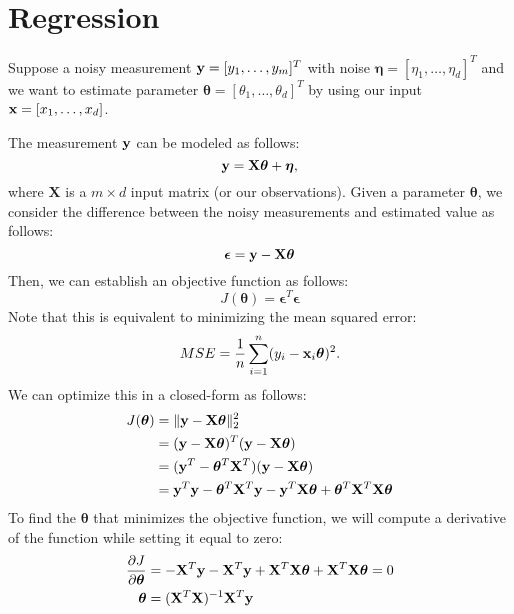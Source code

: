 \chapter{Regression}
\label{sec:basic_regression}
Suppose a noisy measurement ${\mathbf{y}} = [y_1, \dots, y_m]^T$ with noise $\boldsymbol{\eta} = [\eta_1, \dots, \eta_d]^T$ and we want to estimate parameter $\boldsymbol{\theta} = [\theta_1,\dots,\theta_d]^T$ by using our input ${\mathbf{x}} = [x_1, \dots, x_d]$. 

The measurement ${\mathbf{y}}$ can be modeled as follows:
$${\mathbf{y}} = \mathbf{X}\boldsymbol{\theta}+\boldsymbol{\eta},$$
where $\mathbf{X}$ is a $m\times d$ input matrix (or our observations). Given a parameter $\boldsymbol{\theta}$, we consider the difference between the noisy measurements and estimated value as follows:
$$\boldsymbol{\epsilon} = {\mathbf{y}} - \mathbf{X}\boldsymbol{\theta}$$
Then, we can establish an objective function as follows:
$$J(\boldsymbol{\theta}) = \boldsymbol{\epsilon}^T\boldsymbol{\epsilon}$$
Note that this is equivalent to minimizing the mean squared error:
$$MSE = \frac{1}{n}\sum_{i=1}^n (y_i-{\mathbf{x}}_i\boldsymbol{\theta})^2.$$
We can optimize this in a closed-form as follows:
\begin{align*}
	J(\boldsymbol{\theta}) &= \|\mathbf{y}-\mathbf{X}\boldsymbol{\theta}\|^2_2 \\
			&= (\mathbf{y}-\mathbf{X}\boldsymbol{\theta})^T(\mathbf{y}-\mathbf{X}\boldsymbol{\theta})\\
			&= (\mathbf{y}^T-\boldsymbol{\theta}^T\mathbf{X}^T)(\mathbf{y}-\mathbf{X}\boldsymbol{\theta})\\
			&= {\mathbf{y}}^T{\mathbf{y}}-\boldsymbol{\theta}^T\mathbf{X}^T{\mathbf{y}}-{\mathbf{y}}^T\mathbf{X}\boldsymbol{\theta}+\boldsymbol{\theta}^T\mathbf{X}^T\mathbf{X}\boldsymbol{\theta}
\end{align*}
To find the $\boldsymbol{\theta}$ that minimizes the objective function, we will compute a derivative of the function while setting it equal to zero:
\begin{align*}
	\frac{\partial J}{\partial \boldsymbol{\theta}}&= -\mathbf{X}^T{\mathbf{y}}-\mathbf{X}^T{\mathbf{y}}+\mathbf{X}^T\mathbf{X}\boldsymbol{\theta}+\mathbf{X}^T\mathbf{X}\boldsymbol{\theta} = 0\\
	\boldsymbol{\theta}	&= (\mathbf{X}^T\mathbf{X})^{-1}\mathbf{X}^T{\mathbf{y}}
\end{align*}
